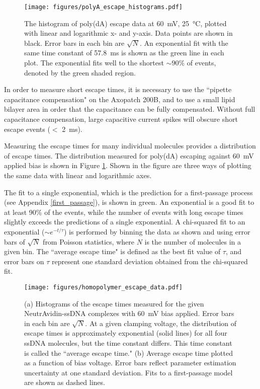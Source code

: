\begin{figure}[!h]
\begin{centering}
\texttt{[image: figures/polyA\_escape\_histograms.pdf]}
\caption[Measured escape times of poly(dA) ssDNA from MspA]{The histogram of poly(dA) escape data at \SI{60}{\mV}, \SI{25}{\celsius}, plotted with linear and logarithmic x- and y-axis.  Data points are shown in black.  Error bars in each bin are $\sqrt{N}$.  An exponential fit with the same time constant of \SI{57.8}{\ms} is shown as the green line in each plot.  The exponential fits well to the shortest $\sim 90\%$ of events, denoted by the green shaded region.}
\label{fig:polyA_escape_times}
\end{centering}
\end{figure}

In order to measure short escape times, it is necessary to use the ``pipette capacitance compensation" on the Axopatch 200B, and to use a small lipid bilayer area in order that the capacitance can be fully compensated.  Without full capacitance compensation, large capacitive current spikes will obscure short escape events ($<$ \SI{2}{\ms}).

Measuring the escape times for many individual molecules provides a distribution of escape times.  The distribution measured for poly(dA) escaping against \SI{60}{\mV} applied bias is shown in Figure \ref{fig:polyA_escape_times}.  Shown in the figure are three ways of plotting the same data with linear and logarithmic axes.

The fit to a single exponential, which is the prediction for a first-passage process (see Appendix \ref{first_passage}), is shown in green.  An exponential is a good fit to at least 90\% of the events, while the number of events with long escape times slightly exceeds the predictions of a single exponential.  A chi-squared fit to an exponential ($\sim e^{-t/\tau}$) is performed by binning the data as shown and using error bars of $\sqrt{N}$ from Poisson statistics, where $N$ is the number of molecules in a given bin.  The ``average escape time" is defined as the best fit value of $\tau$, and error bars on $\tau$ represent one standard deviation obtained from the chi-squared fit.

\begin{figure}[h]
\begin{centering}
\texttt{[image: figures/homopolymer\_escape\_data.pdf]}
\caption[Measured escape times of homopolymer ssDNA from MspA]{(a) Histograms of the escape times measured for the given NeutrAvidin-ssDNA complexes with \SI{60}{\mV} bias applied.  Error bars in each bin are $\sqrt{N}$.  At a given clamping voltage, the distribution of escape times is approximately exponential (solid lines) for all four ssDNA molecules, but the time constant differs.  This time constant is called the ``average escape time."  (b) Average escape time plotted as a function of bias voltage.  Error bars reflect parameter estimation uncertainty at one standard deviation.  Fits to a first-passage model are shown as dashed lines.}
\label{fig:escape_times}
\end{centering}
\end{figure}

